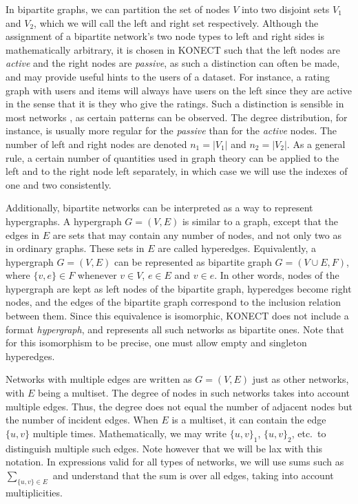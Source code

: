 \documentclass{article}
\begin{document}
In bipartite graphs, we can partition the set of nodes $V$ into two
disjoint sets $V_1$ and $V_2$, which we will call the left and right
set respectively.  Although the assignment of a bipartite network's two
node types to left and right sides is mathematically arbitrary, it is
chosen in KONECT such that the left nodes are \emph{active} and the
right nodes are \emph{passive}, as such a distinction can often be made,
and may provide useful hints to the users of a dataset.  For instance, a rating graph with users
and items will always have users on the left since they are active in
the sense that it is they who give the ratings. 
Such a distinction is sensible in most networks \citep{b732}, as certain
patterns can be observed.  The degree distribution, for instance, is
usually more regular for the \emph{passive} than for the \emph{active} nodes.
The number of left and
right nodes are denoted $n_1 = |V_1|$ and $n_2 = |V_2|$.  As a general
rule, a certain number of quantities used in graph theory can be applied
to the left and to the right node left separately, in which case we will
use the indexes of one and two consistently. 

Additionally, bipartite networks can be interpreted as a way to
represent hypergraphs.  A hypergraph $G=(V,E)$ is similar to a graph,
except that the edges in $E$ are sets that may contain any number of
nodes, and not only two as in ordinary graphs.  These sets in $E$ are
called hyperedges.  Equivalently, a
hypergraph $G=(V,E)$ can be represented as bipartite graph $G=(V \cup E,
F)$, where $\{v,e\} \in F$ whenever $v\in V$, $e \in E$ and $v \in e$.
In other words, nodes of the hypergraph are kept as left nodes of the
bipartite graph, hyperedges become right nodes, and the edges of the
bipartite graph correspond to the inclusion relation between them.
Since this equivalence is isomorphic, KONECT does not include a format
\emph{hypergraph}, and represents all such networks as bipartite ones.
Note that for this isomorphism to be precise, one must allow empty and
singleton hyperedges. 

Networks with multiple edges are written as $G=(V,E)$ just as other networks, with $E$ being
a multiset.  The degree of nodes in such networks takes into account
multiple edges.  Thus, the degree does not equal the number of adjacent
nodes but the number of incident edges.  When $E$ is a multiset, it can
contain the edge $\{u,v\}$ multiple times.  Mathematically, we 
may write $\{u,v\}_1$, $\{u,v\}_2$, etc.\ to distinguish multiple such
edges.   Note however that we will be lax with
this notation.  In expressions valid for all types of networks, we will
use sums such as $\sum_{\{u,v\}\in E}$ and understand that the sum
is over all edges, taking into account multiplicities. 
\end{document}
